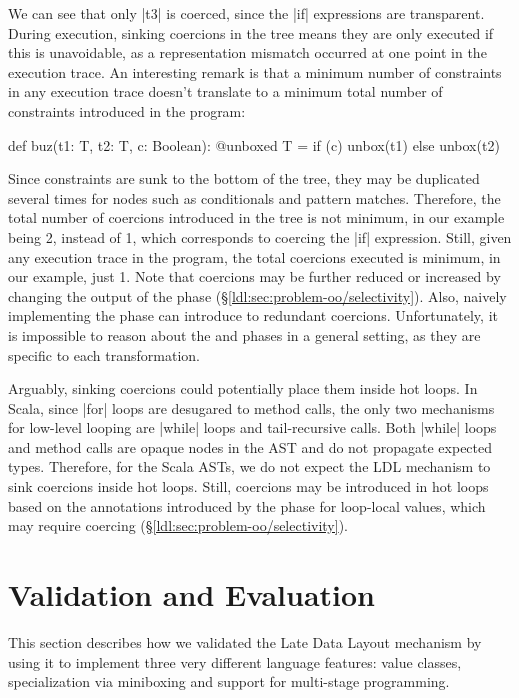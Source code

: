 We can see that only |t3| is coerced, since the |if| expressions are transparent. During execution, sinking coercions in the tree means they are only executed if this is unavoidable, as a representation mismatch occurred at one point in the execution trace. An interesting remark is that a minimum number of constraints in any execution trace doesn't translate to a minimum total number of constraints introduced in the program:

\begin{lstlisting-nobreak}
def buz(t1: T, t2: T, c: Boolean): @unboxed T =
  if (c)
    unbox(t1)
  else
    unbox(t2)
\end{lstlisting-nobreak}

Since constraints are sunk to the bottom of the tree, they may be duplicated several times for nodes such as conditionals and pattern matches. Therefore, the total number of coercions introduced in the tree is not minimum, in our example being 2, instead of 1, which corresponds to coercing the |if| expression. Still, given any execution trace in the program, the total coercions executed is minimum, in our example, just 1. Note that coercions may be further reduced or increased by changing the output of the \inject{} phase (\S\ref{ldl:sec:problem-oo/selectivity}). Also, naively implementing the \commit{} phase can introduce to redundant coercions. Unfortunately, it is impossible to reason about the \inject{} and \commit{} phases in a general setting, as they are specific to each transformation.

Arguably, sinking coercions could potentially place them inside hot loops. In Scala, since |for| loops are desugared to method calls, the only two mechanisms for low-level looping are |while| loops and tail-recursive calls. Both |while| loops and method calls are opaque nodes in the AST and do not propagate expected types. Therefore, for the Scala ASTs, we do not expect the LDL mechanism to sink coercions inside hot loops. Still, coercions may be introduced in hot loops based on the annotations introduced by the \inject{} phase for loop-local values, which may require coercing (\S\ref{ldl:sec:problem-oo/selectivity}).

\section{Validation and Evaluation}
\label{ldl:sec:validation}

This section describes how we validated the Late Data Layout mechanism by using it to implement three very different language features: value classes, specialization via miniboxing and support for multi-stage programming.

